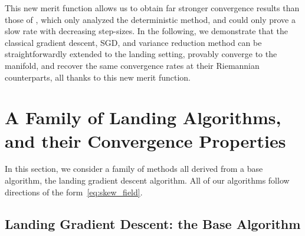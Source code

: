 \documentclass[twoside,11pt]{article}
\newcommand{\revision}[1]{{#1}}
\begin{document}
\revision{This new merit function allows us to obtain far stronger convergence results than those of \cite{ablin2022fast}, which only analyzed the deterministic method, and could only prove a slow rate with decreasing step-sizes.
In the following, we demonstrate that the classical gradient descent, SGD, and variance reduction method can be straightforwardly extended to the landing setting, provably converge to the manifold, and recover the same convergence rates at their Riemannian counterparts, all thanks to this new merit function.}
%
%
%

%
%
%
%
%

%

%
%
%
%

%

%
%
%

%
%
%

%
%
%
%
%
%

%
%


%
%
%
%
%

%
%
%
%
%

%
%
%
%
%
%

%
%
%
%
%
%
%
%

%
%
%
%
%
%
%
%
%
%
%
%
%
%
%
%
%

%
%
%
%


%
%

%
%
%

%


%

%
%
%
%
%
%
%
%

%
%
%
%
%
%
%
%
%
%
%
%
%
%
%

%
%
%
%
%
%
%
%
%
%
%
%
%

%
%
%
%
%
%
%
%
%
%
%
%

%
%
%
%
%
%
%
%
%
%
%
%
%

%

\section{A Family of Landing Algorithms, and their Convergence Properties}
\label{sec:algorithms}
In this section, we consider a family of methods all derived from a base algorithm, the landing gradient descent algorithm. All of our algorithms follow directions of the form~\eqref{eq:skew_field}.
%

\subsection{Landing Gradient Descent: the Base Algorithm} \label{subsec:landing_gradient}
\end{document}
